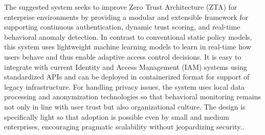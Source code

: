 \documentclass[conference]{IEEEtran}
\begin{document}
The suggested system seeks to improve Zero Trust Architecture (ZTA) for enterprise environments by providing a modular and extensible framework for supporting continuous authentication, dynamic trust scoring, and real-time behavioral anomaly detection. In contrast to conventional static policy models, this system uses lightweight machine learning models to learn in real-time how users behave and thus enable adaptive access control decisions. It is easy to integrate with current Identity and Access Management (IAM) systems using standardized APIs and can be deployed in containerized format for support of legacy infrastructure. For handling privacy issues, the system uses local data processing and anonymization technologies so that behavioral monitoring remains not only in line with user trust but also organizational culture. The design is specifically light so that adoption is possible even by small and medium enterprises, encouraging pragmatic scalability without jeopardizing security.\cite{paper2,paper6,paper8,paper10,paper12}.
\end{document}
